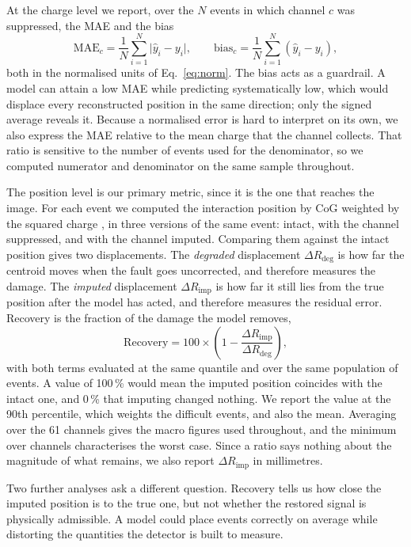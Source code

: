 \documentclass[10pt,conference]{IEEEtran}
\begin{document}
At the charge level we report, over the $N$ events in which channel $c$ was
suppressed, the MAE and the bias
%
\begin{equation}
\mathrm{MAE}_{c} = \frac{1}{N} \sum_{i=1}^{N} \lvert \hat{y}_{i} - y_{i} \rvert,
\qquad
\mathrm{bias}_{c} = \frac{1}{N} \sum_{i=1}^{N} (\hat{y}_{i} - y_{i}),
\label{eq:mae}
\end{equation}
%
both in the normalised units of Eq.~\ref{eq:norm}. The bias acts as a
guardrail. A model can attain a low MAE while predicting systematically low,
which would displace every reconstructed position in the same direction; only
the signed average reveals it. Because a normalised error is hard to interpret
on its own, we also express the MAE relative to the mean charge that the
channel collects. That ratio is sensitive to the number of events used for the
denominator, so we computed numerator and denominator on the same sample
throughout.

The position level is our primary metric, since it is the one that reaches the
image. For each event we computed the interaction position by CoG weighted by
the squared charge \cite{anger1958, poladyan2020}, in three versions of the
same event: intact, with the channel suppressed, and with the channel imputed.
Comparing them against the intact position gives two displacements. The
\emph{degraded} displacement $\Delta R_{\mathrm{deg}}$ is how far the centroid
moves when the fault goes uncorrected, and therefore measures the damage. The
\emph{imputed} displacement $\Delta R_{\mathrm{imp}}$ is how far it still lies
from the true position after the model has acted, and therefore measures the
residual error. Recovery is the fraction of the damage the model removes,
%
\begin{equation}
\mathrm{Recovery} = 100 \times
  \left( 1 - \frac{\Delta R_{\mathrm{imp}}}{\Delta R_{\mathrm{deg}}} \right),
\label{eq:recovery}
\end{equation}
%
with both terms evaluated at the same quantile and over the same population of
events. A value of 100\,\% would mean the imputed position coincides with the
intact one, and 0\,\% that imputing changed nothing. We report the value at the
90th percentile, which weights the difficult events, and also the mean.
Averaging over the 61 channels gives the macro figures used throughout, and the
minimum over channels characterises the worst case. Since a ratio says nothing
about the magnitude of what remains, we also report
$\Delta R_{\mathrm{imp}}$ in millimetres.

Two further analyses ask a different question. Recovery tells us how close the
imputed position is to the true one, but not whether the restored signal is
physically admissible. A model could place events correctly on average while
distorting the quantities the detector is built to measure.
\end{document}
